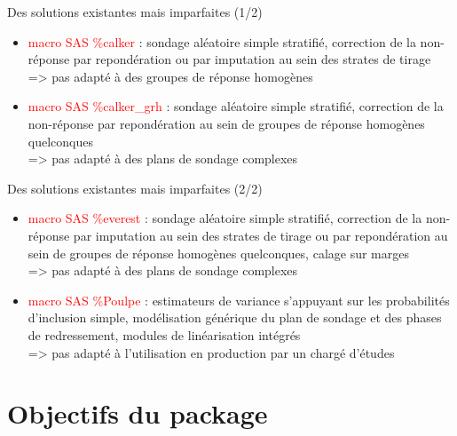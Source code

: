\documentclass[xcolor=dvipsnames]{beamer}
\begin{document}
\begin{frame}{Des solutions existantes mais imparfaites (1/2)}
\begin{itemize}
    \item \textcolor{red}{macro SAS \%calker} : sondage aléatoire simple stratifié, correction de la non-réponse par repondération ou par imputation au sein des strates de tirage \\ => pas adapté à des groupes de réponse homogènes
    
    \vspace{0.5 cm}
    
    \item \textcolor{red}{macro SAS \%calker\_grh} : sondage aléatoire simple stratifié, correction de la non-réponse par repondération au sein de groupes de réponse homogènes quelconques \\ => pas adapté à des plans de sondage complexes
    
\end{itemize}
\end{frame}

\begin{frame}{Des solutions existantes mais imparfaites (2/2)}
\begin{itemize}

    \item \textcolor{red}{macro SAS \%everest} : sondage aléatoire simple stratifié, correction de la non-réponse par imputation au sein des strates de tirage ou par repondération au sein de groupes de réponse homogènes quelconques, calage sur marges \\ => pas adapté à des plans de sondage complexes
    
    \vspace{0.5 cm}
    \item \textcolor{red}{macro SAS \%Poulpe} : estimateurs de variance s'appuyant sur les probabilités d'inclusion simple, modélisation générique du plan de sondage et des phases de redressement, modules de linéarisation intégrés \\ => pas adapté à l'utilisation en production par un chargé d'études
    
\end{itemize}
\end{frame}

\section{Objectifs du package}
\end{document}
